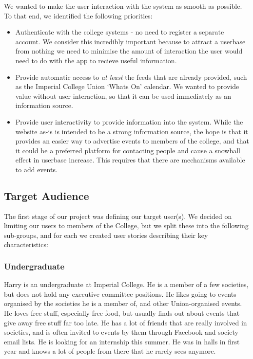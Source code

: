 \documentclass[11pt]{article}
\begin{document}
We wanted to make the user interaction with the system as smooth as possible. To that end, we identified the following priorities:

\begin{itemize}
\item Authenticate with the college systems - no need to register a separate account. We consider this incredibly important because to attract a userbase from nothing we need to minimise the amount of interaction the user would need to do with the app to recieve useful information.

\item Provide automatic access to \textit{at least} the feeds that are already provided, such as the Imperial College Union `Whats On' calendar. We wanted to provide value without user interaction, so that it can be used immediately as an information source.

\item Provide user interactivity to provide information into the system. While the website as-is is intended to be a strong information source, the hope is that it provides an easier way to advertise events to members of the college, and that it could be a preferred platform for contacting people and cause a snowball effect in userbase increase. This requires that there are mechanisms available to add events.
\end{itemize}

\subsection {Target Audience}

The first stage of our project was defining our target user(s). We decided on limiting our users to members of the College, but we split these into the following sub-groups, and for each we created user stories describing their key characteristics:

\subsubsection{Undergraduate}
Harry is an undergraduate at Imperial College. He is a member of a few societies, but does not hold any executive committee positions. He likes going to events organised by the societies he is a member of, and other Union-organised events. He loves free stuff, especially free food, but usually finds out about events that give away free stuff far too late. He has a lot of friends that are really involved in societies, and is often invited to events by them through Facebook and society email lists. He is looking for an internship this summer. He was in halls in first year and knows a lot of people from there that he rarely sees anymore.
\end{document}
